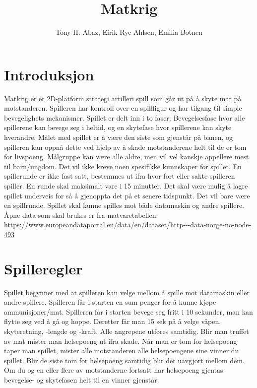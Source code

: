 \documentclass[norsk,a4paper]{article}
\title{Matkrig}
\author{Tony H. Abaz, Eirik Rye Ahlsen, Emilia Botnen}
\date{}
\begin{document}
\maketitle
\date{}

\section*{Introduksjon}
Matkrig er et 2D-platform strategi artilleri spill som går ut på å skyte mat på motstanderen. Spilleren har kontroll  over en spillfigur og har tilgang til simple bevegelighets mekanismer. Spillet er delt inn i to faser; Bevegelsesfase hvor alle spillerene kan bevege seg i heltid, og en skytefase hvor spillerene kan skyte hverandre. Målet med spillet er å være den siste som gjenstår på banen, og spilleren kan oppnå dette ved hjelp av å skade motstanderene helt til de er tom for livspoeng. Målgruppe kan være alle aldre, men vil vel kanskje appellere mest til barn/ungdom. Det vil ikke kreve noen spesifikke kunnskaper for spillet. En spillerunde er ikke fast satt, bestemmes ut ifra hvor fort eller sakte spilleren spiller. En runde skal maksimalt vare i 15 minutter. Det skal være mulig å lagre spillet underveis for så å gjenoppta det på et senere tidspunkt. Det vil bare være en spillrunde. Spillet skal kunne spilles mot både datamaskin og andre spillere. Åpne data som skal brukes er fra matvaretabellen: \url {https://www.europeandataportal.eu/data/en/dataset/http---data-norge-no-node-493}



\tableofcontents


\newpage
\section{Spilleregler}
Spillet begynner med at spilleren kan velge mellom å spille mot datamaskin eller andre spillere. Spilleren får i starten en sum penger for å kunne kjøpe ammunisjoner/mat. Spilleren får i starten bevege seg fritt i 10 sekunder, man kan flytte seg ved å gå og hoppe. Deretter får man 15 sek på å velge våpen, skyteretning, -lengde og -kraft. Alle angrepene utføres samtidig. Blir man truffet av mat mister man helsepoeng ut ifra skade. Når man er tom for helsepoeng taper man spillet, mister alle motstanderen alle helsepoengene sine vinner du spillet. Blir de siste tom for helsepoeng samtidig blir det uavgjort mellom dem. Om du og en eller flere av motstanderne fortsatt har helsepoeng gjentas bevegelse- og skytefasen helt til en vinner gjenstår.
\end{document}
